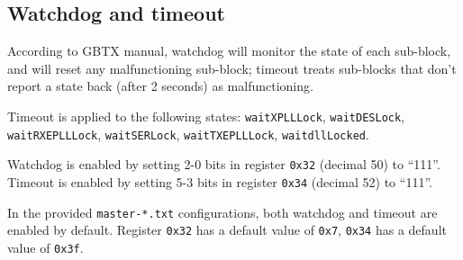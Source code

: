 \subsection{Watchdog and timeout}
According to GBTX manual, watchdog will monitor the state of each sub-block, and
will reset any malfunctioning sub-block; timeout treats sub-blocks that don't
report a state back (after 2 seconds) as malfunctioning.

\begin{leftbar}
    Timeout is applied to the following states:
    \texttt{waitXPLLLock}, \texttt{waitDESLock}, \texttt{waitRXEPLLLock},
    \texttt{waitSERLock}, \texttt{waitTXEPLLLock}, \texttt{waitdllLocked}.
\end{leftbar}

Watchdog is enabled by setting 2-0 bits in register \texttt{0x32} (decimal 50)
to ``111''. Timeout is enabled by setting 5-3 bits in register \texttt{0x34}
(decimal 52) to ``111''.

In the provided \texttt{master-*.txt} configurations, both watchdog and timeout
are enabled by default. Register \texttt{0x32} has a default value of
\texttt{0x7}, \texttt{0x34} has a default value of \texttt{0x3f}.
